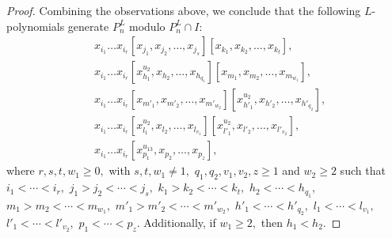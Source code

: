 \documentclass[a4paper,reqno]{amsart}
\theoremstyle{definition}
\numberwithin{equation}{section}
\numberwithin{theorem}{section}
\begin{document}
\begin{proof}
Combining the observations above, we conclude that the  following $L$-polynomials generate $P_{n}^L$ modulo $P_{n}^L\cap I$:
\begin{equation} \label{No IdUT_3^e_1+e_2}
\begin{split}
&x_{i_{1}}\dots x_{i_{r}}[x_{j_1},x_{j_2},\dots,x_{j_s}][x_{k_1},x_{k_2},\dots,x_{k_t}],\\
&x_{i_{1}}\dots x_{i_{r}}[x_{h_1}^{u_{2}},x_{h_2},\dots,x_{h_{q_1}}][x_{m_1},x_{m_2},\dots,x_{m_{w_1}}],\\
&x_{i_{1}}\dots x_{i_{r}}[x_{m'_1},x_{m'_2},\dots,x_{m'_{w_2}}][x_{h'_1}^{u_{2}},x_{h'_2},\dots,x_{h'_{q_2}}],\\
&x_{i_{1}}\dots x_{i_{r}}[x_{l_1}^{u_{2}},x_{l_2},\dots,x_{l_{v_1}}][x_{l'_1}^{u_{2}},x_{l'_2},\dots,x_{l'_{v_2}}],\\
&x_{i_{1}}\dots x_{i_{r}}[x_{p_1}^{u_{13}},x_{p_2},\dots,x_{p_z}],
\end{split}
\end{equation}
where $r,s,t, w_1 \geq 0,$ with $s,t,w_1\neq 1,$ $q_1,q_2,v_1,v_2,z\geq 1$ and $w_2\geq 2$ such that $i_1< \cdots < i_r,$ $j_1>j_2<  \cdots < j_s,$ $k_1>k_2<  \cdots < k_t,$ $h_2< \cdots <h_{q_1},$ $m_1> m_2< \cdots < m_{w_1},$ $m'_1> m'_2< \cdots < m'_{w_2},$ $h'_1< \cdots <h'_{q_2},$ $l_1< \cdots < l_{v_1},$ $l'_1< \cdots < l'_{v_2},$  $p_1< \cdots < p_z.$ Additionally, if $w_1\geq 2,$ then $h_1< h_2$. 




\end{proof}
\end{document}
